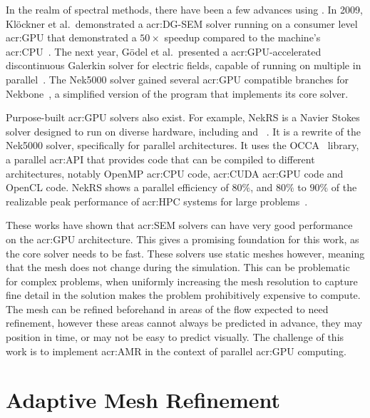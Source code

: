In the realm of spectral methods, there have been a few advances using . In
2009, Klöckner et al.\ demonstrated a \acrshort{acr:DG-SEM} solver running on a consumer level
\acrshort{acr:GPU} that demonstrated a \(50 \times \) speedup compared to the machine's
\acrshort{acr:CPU}~\cite{Klockner2009}. The next year, Gödel et al.\ presented a
\acrshort{acr:GPU}-accelerated discontinuous Galerkin solver for electric fields, capable of running
on multiple  in parallel~\cite{Godel2010}. The Nek5000 solver gained several
\acrshort{acr:GPU} compatible branches for Nekbone~\cite{Gong2016}\cite{Chalmers2022}, a simplified
version of the program that implements its core solver.

Purpose-built \acrshort{acr:GPU} solvers also exist. For example,  NekRS is a Navier Stokes solver
designed to run on diverse hardware, including  and
~\cite{Fischer2021}. It is a rewrite of the Nek5000 solver, specifically for
parallel architectures. It uses the OCCA~\cite{Medina2014} library, a parallel \acrshort{acr:API}
that provides code that can be compiled to different architectures, notably OpenMP
\acrshort{acr:CPU} code, \acrshort{acr:CUDA} \acrshort{acr:GPU} code and OpenCL code. NekRS shows a
parallel efficiency of \(80 \% \), and \(80 \% \) to \(90 \% \) of the realizable peak performance
of \acrshort{acr:HPC} systems for large problems~\cite{Fischer2021}.

These works have shown that \acrshort{acr:SEM} solvers can have very good performance on the
\acrshort{acr:GPU} architecture. This gives a promising foundation for this work, as the core solver
needs to be fast. These solvers use static meshes however, meaning that the mesh does not change
during the simulation. This can be problematic for complex problems, when uniformly increasing the
mesh resolution to capture fine detail in the solution makes the problem prohibitively expensive to
compute. The mesh can be refined beforehand in areas of the flow expected to need refinement,
however these areas cannot always be predicted in advance, they may position in time, or may not be
easy to predict visually. The challenge of this work is to implement \acrlong{acr:AMR} in the
context of parallel \acrshort{acr:GPU} computing.

\section{Adaptive Mesh Refinement}\label{section:literature_review:amr}

